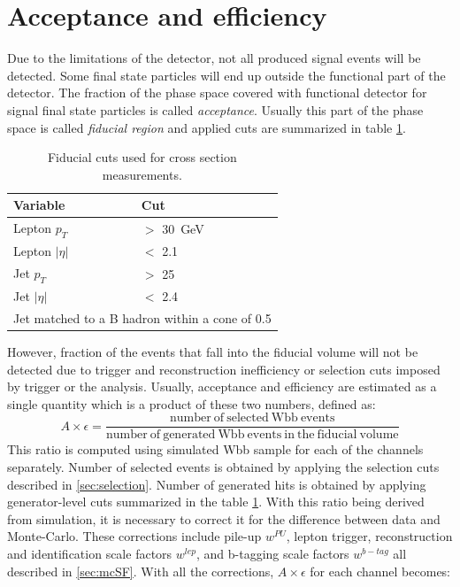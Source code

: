 
\section{Acceptance and efficiency}
    
Due to the limitations of the detector, not all produced signal events will be detected. Some final state particles will end up outside the functional part of the detector. The fraction of the phase space covered with functional detector for signal final state particles is called \textit{acceptance}. Usually this part of the phase space is called \textit{fiducial region} and applied cuts are summarized in table \ref{tab:fiducial}.             
\begin{table}[!htb]
\begin{center}
   \begin{tabular} {l l} \hline \hline
        Variable         & Cut \\
        \hline
        Lepton $p_T$    & $>$ 30\ GeV \\
        Lepton $|\eta|$   & $<$ 2.1 \\
        Jet $p_T$       & $>$ 25  \\
        Jet $|\eta|$      & $<$ 2.4 \\
        \multicolumn{2}{l}{
        Jet matched to a B hadron within a cone of 0.5} \\
        \hline\hline
   \end{tabular}
\caption{Fiducial cuts used for cross section measurements.}
\label{tab:fiducial}
\end{center}
\end{table}
However, fraction of the events that fall into the fiducial volume will not be detected due to trigger and reconstruction inefficiency or selection cuts imposed by trigger or the analysis. Usually, acceptance and efficiency are estimated as a single quantity which is a product of these two numbers, defined as:
\begin{equation}
A\times \epsilon=\frac{\mathrm{number\ of\ selected\ Wbb\ events}}{\mathrm{number\ of\ generated\ Wbb\ events\ in\ the\ fiducial\ volume}}
\end{equation}
This ratio is computed using simulated Wbb sample for each of the channels separately. Number of selected events is obtained by applying the selection cuts described in \ref{sec:selection}. Number of generated hits is obtained by applying generator-level cuts summarized in the table \ref{tab:fiducial}. With this ratio being derived from simulation, it is necessary to correct it for the difference between data and Monte-Carlo. These corrections include pile-up  $w^{PU}$, lepton trigger, reconstruction and identification scale factors $w^{lep}$, and b-tagging scale factors $w^{b-tag}$ all described in \ref{sec:mcSF}. With all the corrections, $A\times \epsilon$ for each channel becomes:
